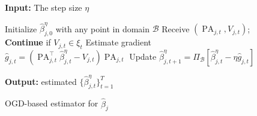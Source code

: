 \documentclass{article}
\theoremstyle{plain}
\theoremstyle{definition}
\theoremstyle{remark}
\def \sB {\mathcal{B}}
\def \PA {\operatorname{PA}}
\begin{document}
\setlength{\intextsep}{1pt}
\begin{figure}
  \begin{minipage}{\linewidth}
  \begin{algorithm}[H]
    \caption{OGD-based estimator for $\hat{\beta}_j$}
    \label{alg:ogd}
    \textbf{Input:} The step size $\eta$
  \begin{algorithmic}[1]
    \State Initialize $\hat{\beta}^\eta_{j, 0}$ with any point in domain $\sB$
      \State Receive $\left(\PA_{j,t}, V_{j, t}\right)$; \textbf{Continue} if $V_{j, t}\in \xi_t$
      \State Estimate gradient $\hat{g}_{j, t} = \left(\PA^\top_{j, t} \hat{\beta}^\eta_{j, t} - V_{j, t}\right) \PA_{j, t}$
      \State Update $\hat{\beta}^\eta_{j, t+1} = \Pi_{\sB}\left[\hat{\beta}^\eta_{j, t} - \eta \hat{g}_{j, t}\right]$
    \EndFor
  \end{algorithmic}
  \textbf{Output:} estimated $\{\hat{\beta}^\eta_{j, t}\}_{t=1}^T$
  \end{algorithm}
  \end{minipage}
  \end{figure}
\end{document}
